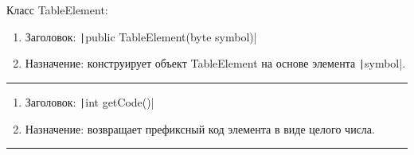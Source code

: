 \documentclass[a4paper,14pt]{extarticle}
\begin{document}
Класс TableElement:

\begin{enumerate}
    \item Заголовок: \texttt|public TableElement(byte symbol)|
    \item Назначение: конструирует объект TableElement на основе элемента \texttt|symbol|.
\end{enumerate}
\par\noindent\rule{\textwidth}{0.4pt}

\begin{enumerate}
    \item Заголовок: \texttt|int getCode()|
    \item Назначение: возвращает префиксный код элемента в виде целого числа.
\end{enumerate}

\par\noindent\rule{\textwidth}{0.4pt}
\end{document}

